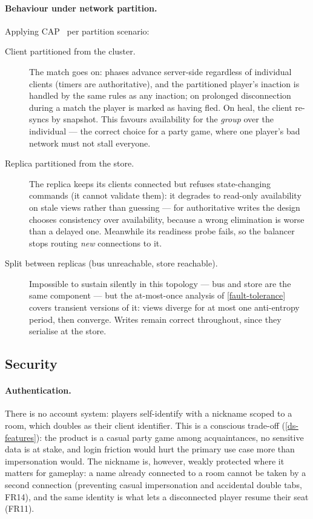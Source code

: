 \documentclass{scrartcl}
\begin{document}
\paragraph{Behaviour under network partition.}
Applying CAP~\cite{gilbert2002brewer} per partition scenario:

\begin{description}
  \item[Client partitioned from the cluster.] The match goes on: phases
  advance server-side regardless of individual clients (timers are
  authoritative), and the partitioned player's inaction is handled by the
  same rules as any inaction; on prolonged disconnection during a match
  the player is marked as having fled. On heal, the client re-syncs by
  snapshot. This favours availability for the \emph{group} over the
  individual --- the correct choice for a party game, where one player's
  bad network must not stall everyone.

  \item[Replica partitioned from the store.] The replica keeps its
  clients connected but refuses state-changing commands (it cannot
  validate them): it degrades to read-only availability on stale views
  rather than guessing --- for authoritative writes the design chooses
  consistency over availability, because a wrong elimination is worse
  than a delayed one. Meanwhile its readiness probe fails, so the
  balancer stops routing \emph{new} connections to it.

  \item[Split between replicas (bus unreachable, store reachable).]
  Impossible to sustain silently in this topology --- bus and store are the
  same component --- but the at-most-once analysis of
  \cref{fault-tolerance} covers transient versions of it: views diverge
  for at most one anti-entropy period, then converge. Writes remain
  correct throughout, since they serialise at the store.
\end{description}

\subsection{Security}\label{security}

\paragraph{Authentication.}
There is no account system: players self-identify with a nickname scoped
to a room, which doubles as their client identifier. This is a conscious
trade-off (\cref{ds-features}): the product is a casual party game among
acquaintances, no sensitive data is at stake, and login friction would
hurt the primary use case more than impersonation would. The nickname is,
however, weakly protected where it matters for gameplay: a name already
connected to a room cannot be taken by a second connection (preventing
casual impersonation and accidental double tabs, FR14), and the same
identity is what lets a disconnected player resume their seat (FR11).
\end{document}
